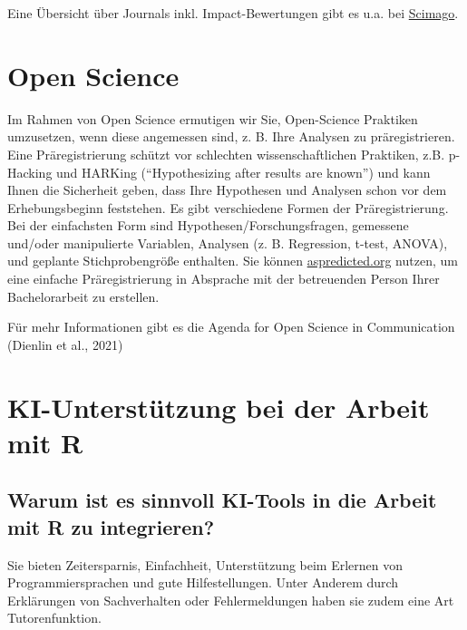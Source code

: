 \documentclass[
  letterpaper,
  DIV=11]{scrreprt}
\begin{document}
Eine Übersicht über Journals inkl. Impact-Bewertungen gibt es u.a. bei
\href{https://www.scimagojr.com/journalrank.php?category=3315&order=sjr&ord=desc}{Scimago}.

\chapter{Open Science}\label{open-science}

Im Rahmen von Open Science ermutigen wir Sie, Open-Science Praktiken
umzusetzen, wenn diese angemessen sind, z. B. Ihre Analysen zu
präregistrieren. Eine Präregistrierung schützt vor schlechten
wissenschaftlichen Praktiken, z.B. p-Hacking und HARKing
(``Hypothesizing after results are known'') und kann Ihnen die
Sicherheit geben, dass Ihre Hypothesen und Analysen schon vor dem
Erhebungsbeginn feststehen. Es gibt verschiedene Formen der
Präregistrierung. Bei der einfachsten Form sind
Hypothesen/Forschungsfragen, gemessene und/oder manipulierte Variablen,
Analysen (z. B. Regression, t-test, ANOVA), und geplante
Stichprobengröße enthalten. Sie können
\href{https://aspredicted.org}{aspredicted.org} nutzen, um eine einfache
Präregistrierung in Absprache mit der betreuenden Person Ihrer
Bachelorarbeit zu erstellen.

Für mehr Informationen gibt es die Agenda for Open Science in
Communication (Dienlin et al., 2021)

\chapter{KI-Unterstützung bei der Arbeit mit
R}\label{ki-unterstuxfctzung-bei-der-arbeit-mit-r}

\section{Warum ist es sinnvoll KI-Tools in die Arbeit mit R zu
integrieren?}\label{warum-ist-es-sinnvoll-ki-tools-in-die-arbeit-mit-r-zu-integrieren}

Sie bieten Zeitersparnis, Einfachheit, Unterstützung beim Erlernen von
Programmiersprachen und gute Hilfestellungen. Unter Anderem durch
Erklärungen von Sachverhalten oder Fehlermeldungen haben sie zudem eine
Art Tutorenfunktion.
\end{document}
